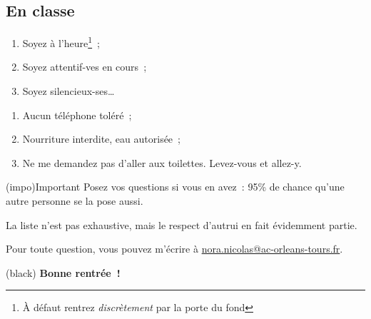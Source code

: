 \documentclass[10pt, garamond]{book}
\begin{document}
\subsection{En classe}
\noindent
\begin{minipage}[t]{.48\linewidth}
	\begin{enumerate}
		\item Soyez à l'heure\footnote{À défaut rentrez \textit{discrètement} par la
			      porte du fond}~;
		\item Soyez attentif-ves en cours~;
		\item Soyez silencieux-ses…
	\end{enumerate}
\end{minipage}
\hfill
\begin{minipage}[t]{.48\linewidth}
	\begin{enumerate}
		\item Aucun téléphone toléré~;
		\item Nourriture interdite, eau autorisée~;
		\item Ne me demandez pas d'aller aux toilettes. Levez-vous et allez-y.
	\end{enumerate}
\end{minipage}

\begin{tcb}[cnt](impo){Important}
	Posez vos questions si vous en avez~: 95\% de chance qu'une autre personne se
	la pose aussi.
\end{tcb}

La liste n'est pas exhaustive, mais le respect d'autrui en fait évidemment
partie.

\vfill

Pour toute question, vous pouvez m'écrire à
\href{nora.nicolas@ac-orleans-tours.fr}{nora.nicolas@ac-orleans-tours.fr}.

\vfill

\begin{tcb}[cnt, boxrule=3pt, sharp corners, valign=center](black){}
	\vspace{-5pt} \Large\bfseries Bonne rentrée~!
\end{tcb}
\end{document}
